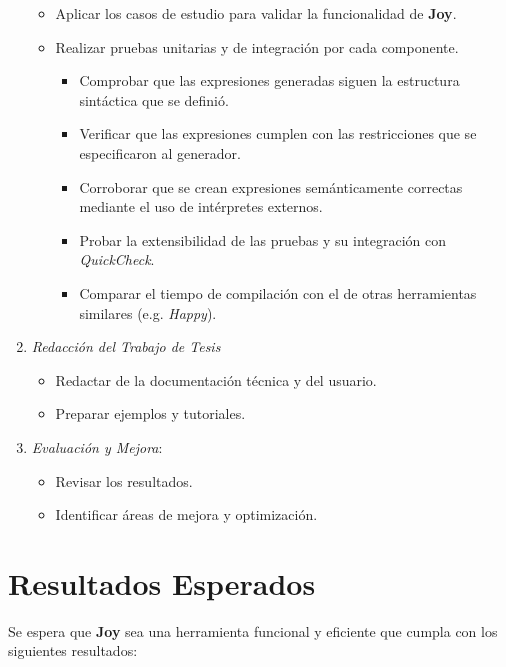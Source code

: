 \documentclass[11pt]{article}
\begin{document}
\begin{enumerate}
  \begin{itemize}
  \item Aplicar los casos de estudio para validar la funcionalidad de \textbf{Joy}.

  \item Realizar pruebas unitarias y de integración por cada componente.

    \begin{itemize}
    \item Comprobar que las expresiones generadas siguen la estructura sintáctica que se definió.
    \item Verificar que las expresiones cumplen con las restricciones que se especificaron al generador.
    \item Corroborar que se crean expresiones semánticamente correctas mediante el uso de intérpretes externos.
      
    \item Probar la extensibilidad de las pruebas y su integración con \textit{QuickCheck}.

    \item Comparar el tiempo de compilación con el de otras herramientas similares (e.g. \textit{Happy}).
    \end{itemize}
  \end{itemize}
\item \textit{Redacción del Trabajo de Tesis}
  
  \begin{itemize}
  \item Redactar de la documentación técnica y del usuario.
  \item Preparar ejemplos y tutoriales.
  \end{itemize}

\item \textit{Evaluación y Mejora}:

  \begin{itemize}
  \item Revisar los resultados.
  \item Identificar áreas de mejora y optimización.
  \end{itemize}
\end{enumerate}

\section*{Resultados Esperados}

Se espera que \textbf{Joy} sea una herramienta funcional y eficiente que cumpla con los siguientes resultados:
\end{document}
